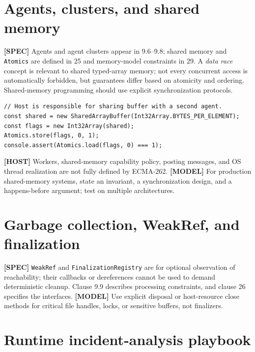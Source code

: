 \documentclass[11pt,letterpaper]{article}
\newcommand{\passthrough}[1]{#1}
\begin{document}
\section{Agents, clusters, and shared memory}\label{agents-clusters-and-shared-memory}

\textbf{{[}SPEC{]}} Agents and agent clusters appear in 9.6--9.8; shared memory and \passthrough{\lstinline!Atomics!} are defined in 25 and memory-model constraints in 29. A \emph{data race} concept is relevant to shared typed-array memory; not every concurrent access is automatically forbidden, but guarantees differ based on atomicity and ordering. Shared-memory programming should use explicit synchronization protocols.

\begin{lstlisting}
// Host is responsible for sharing buffer with a second agent.
const shared = new SharedArrayBuffer(Int32Array.BYTES_PER_ELEMENT);
const flags = new Int32Array(shared);
Atomics.store(flags, 0, 1);
console.assert(Atomics.load(flags, 0) === 1);
\end{lstlisting}

\textbf{{[}HOST{]}} Workers, shared-memory capability policy, posting messages, and OS thread realization are not fully defined by ECMA-262. \textbf{{[}MODEL{]}} For production shared-memory systems, state an invariant, a synchronization design, and a happens-before argument; test on multiple architectures.

\section{Garbage collection, WeakRef, and finalization}\label{garbage-collection-weakref-and-finalization}

\textbf{{[}SPEC{]}} \passthrough{\lstinline!WeakRef!} and \passthrough{\lstinline!FinalizationRegistry!} are for optional observation of reachability; their callbacks or dereferences cannot be used to demand deterministic cleanup. Clause 9.9 describes processing constraints, and clause 26 specifies the interfaces. \textbf{{[}MODEL{]}} Use explicit disposal or host-resource close methods for critical file handles, locks, or sensitive buffers, not finalizers.

\section{Runtime incident-analysis playbook}\label{runtime-incident-analysis-playbook}
\end{document}

